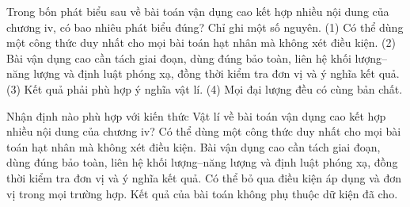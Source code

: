 \begin{ex}
Trong bốn phát biểu sau về bài toán vận dụng cao kết hợp nhiều nội dung của chương iv, có bao nhiêu phát biểu đúng? Chỉ ghi một số nguyên. (1) Có thể dùng một công thức duy nhất cho mọi bài toán hạt nhân mà không xét điều kiện. (2) Bài vận dụng cao cần tách giai đoạn, dùng đúng bảo toàn, liên hệ khối lượng–năng lượng và định luật phóng xạ, đồng thời kiểm tra đơn vị và ý nghĩa kết quả. (3) Kết quả phải phù hợp ý nghĩa vật lí. (4) Mọi đại lượng đều có cùng bản chất.
\end{ex}

\begin{ex}
Nhận định nào phù hợp với kiến thức Vật lí về bài toán vận dụng cao kết hợp nhiều nội dung của chương iv?
\choice
{Có thể dùng một công thức duy nhất cho mọi bài toán hạt nhân mà không xét điều kiện.}
{\True Bài vận dụng cao cần tách giai đoạn, dùng đúng bảo toàn, liên hệ khối lượng–năng lượng và định luật phóng xạ, đồng thời kiểm tra đơn vị và ý nghĩa kết quả.}
{Có thể bỏ qua điều kiện áp dụng và đơn vị trong mọi trường hợp.}
{Kết quả của bài toán không phụ thuộc dữ kiện đã cho.}
\end{ex}


